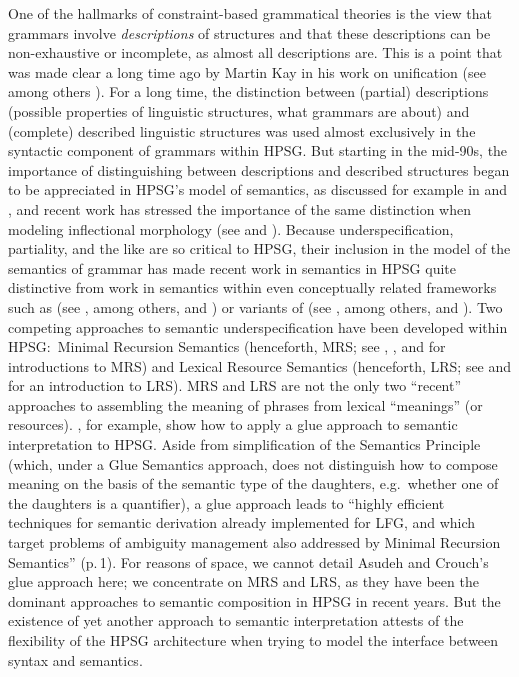 \documentclass[output=paper]{langsci/langscibook}
\begin{document}
One of the hallmarks of constraint-based grammatical theories is the view that grammars involve \emph{descriptions} of structures and that these descriptions can be non-exhaustive or incomplete, as almost all descriptions are.
This is a point that was made clear a long time ago by Martin Kay in his work on unification (see among others \citealt{Kay1979}). For a long time, the distinction between (partial) descriptions (possible properties of linguistic structures, what grammars are about) and (complete) described linguistic structures was used almost exclusively in the syntactic component of grammars within HPSG. But starting in the mid-90s, the importance of distinguishing between descriptions and described structures began to be appreciated in HPSG's model of semantics, as discussed for example in \citet{Nerbonne1993a} and \citet*{Copestakeetal1995}, and recent work has stressed the importance of the same distinction when modeling inflectional morphology (see \citealt{CrysmannandBonami2016} and ). Because underspecification, partiality, and the like are so critical to HPSG, their inclusion in the model of the semantics of grammar has made recent work in semantics in HPSG quite distinctive from work in semantics within even conceptually related frameworks such as  (see \citealt{BresnanandKaplan1982b}, among others, and ) or variants of  (see \citealt{Steedman1996}, among others, and ). Two competing approaches to semantic underspecification have been developed within HPSG:\ Minimal Recursion Semantics (henceforth, MRS; see \citealt{Copestakeetal1995}, \citealt{Copestakeetal2001}, and \citealt{Copestakeetal2005} for introductions to MRS) and Lexical Resource Semantics (henceforth, LRS; see \citealt{RichterandSailer2004,RichterandSailer2001} and \citealt{IordachioaiaandRichter2015} for an introduction to LRS). MRS and LRS are not the only two ``recent'' approaches  to assembling the meaning of phrases from lexical ``meanings'' (or resources). \citet{AsudehandCrouch2002}, for example, show how to apply a glue approach to semantic interpretation to HPSG. Aside from simplification of the Semantics Principle (which, under a Glue Semantics approach, does not
 distinguish how to compose meaning on the basis of the semantic type of the daughters, e.g.\ whether one of the daughters is a quantifier), a glue approach leads to ``highly efficient techniques for semantic derivation already implemented for LFG, and which target problems of ambiguity management also addressed by Minimal Recursion Semantics'' (p.\,1). For reasons of space, we cannot detail Asudeh and Crouch's glue approach here; we concentrate on MRS and LRS, as they have been the dominant approaches to semantic composition in HPSG in recent years. But the existence of yet another approach to semantic interpretation attests of the flexibility of the HPSG architecture when trying to model the interface between syntax and semantics.
\end{document}

